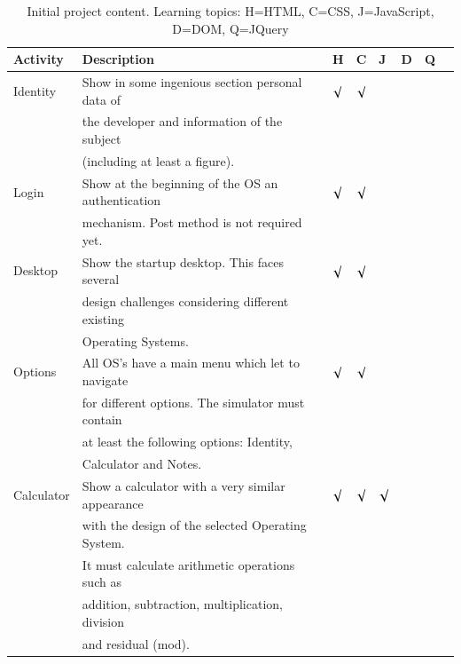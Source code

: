 \begin{table}[htb]
    \begin{center}
        \caption{Initial project content. Learning topics: H=HTML, C=CSS, J=JavaScript, D=DOM, Q=JQuery}
        \label{table:initialProject}
        \begin{tabular}{|l|l|l|l|l|l|l|l|}
        \hline
Activity&  Description                                      & H     & C     & J     & D     & Q   \\\hline

Identity& Show in some ingenious section personal data of   &$\surd$&$\surd$&       &       &     \\
        & the developer and information of the subject      &       &       &       &       &     \\
        & (including at least a figure).                    &       &       &       &       &     \\\hline

Login   & Show at the beginning of the OS an authentication &$\surd$&$\surd$&       &       &     \\
        & mechanism. Post method is not required yet.       &       &       &       &       &     \\\hline
        
Desktop & Show the startup desktop. This faces several      &$\surd$&$\surd$&       &       &     \\
        & design challenges considering different existing  &       &       &       &       &     \\
        & Operating Systems.                                &       &       &       &       &     \\\hline

Options & All OS's have a main menu which let to navigate   &$\surd$&$\surd$&       &       &     \\
        & for different options. The simulator must contain &       &       &       &       &     \\
        & at least the following options: Identity,         &       &       &       &       &     \\
        & Calculator and Notes.                             &       &       &       &       &     \\\hline

Calculator& Show a calculator with a very similar appearance&$\surd$&$\surd$&$\surd$&       &     \\
        & with the design of the selected Operating System. &       &       &       &       &     \\
        & It must calculate arithmetic operations such as   &       &       &       &       &     \\
        & addition, subtraction, multiplication, division   &       &       &       &       &     \\
        & and residual (mod).                               &       &       &       &       &     \\\hline


\end{tabular}
\end{center}
\end{table}
